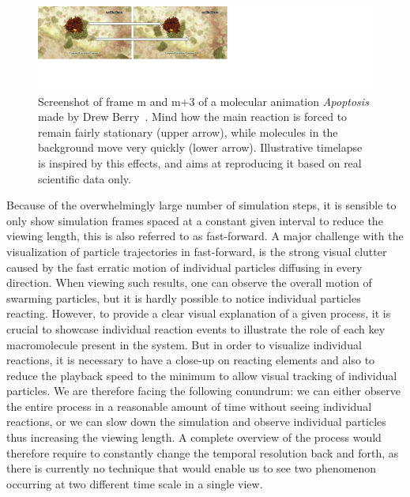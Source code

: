 \begin{figure}
	\centering
	\includegraphics[width=0.9\linewidth]{graphics/Apoptosis}
	\caption{Screenshot of frame m and m+3 of a molecular animation \textit{Apoptosis} made by Drew Berry~\cite{Apoptosis}. Mind how the main reaction is forced to remain fairly stationary
		(upper arrow), while molecules in the background move very quickly (lower arrow). Illustrative timelapse is inspired by this effects, and aims at reproducing it based on real scientific data only.}
	\label{fig:apoptosis}
\end{figure}

Because of the overwhelmingly large number of simulation steps, it is sensible to only show simulation frames spaced at a constant given interval to reduce the viewing length, this is also referred to as fast-forward.
A major challenge with the visualization of particle trajectories in fast-forward, is the strong visual clutter caused by the fast erratic motion of individual particles diffusing in every direction.
When viewing such results, one can observe the overall motion of swarming particles, but it is hardly possible to notice individual particles reacting.
However, to provide a clear visual explanation of a given process, it is crucial to showcase individual reaction events to illustrate the role of each key macromolecule present in the system.
But in order to visualize individual reactions, it is necessary to have a close-up on reacting elements and also to reduce the playback speed to the minimum to allow visual tracking of individual particles.
We are therefore facing the following conundrum: we can either observe the entire process in a reasonable amount of time without seeing individual reactions, or we can slow down the simulation and observe individual particles thus increasing the viewing length.
A complete overview of the process would therefore require to constantly change the temporal resolution back and forth, as there is currently no technique that would enable us to see two phenomenon occurring at two different time scale in a single view.

